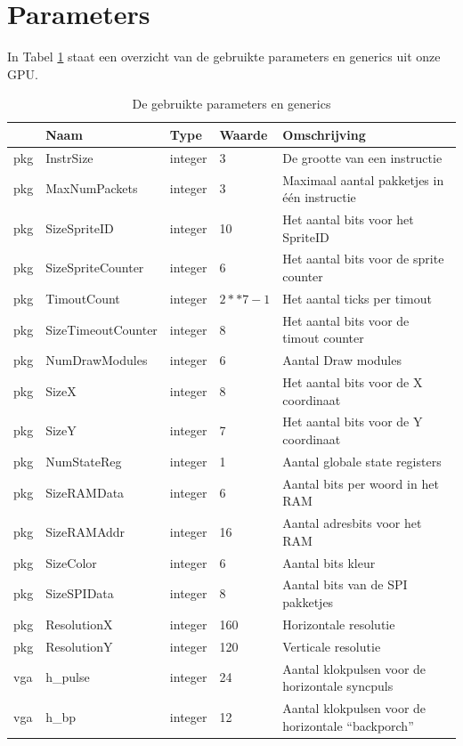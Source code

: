 \documentclass{scrartcl} %
\begin{document}
\section{Parameters} 
In Tabel \ref{tab:spec-params} staat een overzicht van de gebruikte parameters en generics uit onze GPU.

\begin{table}[H]
\centering
\caption{De gebruikte parameters en generics}
\label{tab:spec-params}
\begin{tabular}{l l l l l}
	\hline\hline
 	 & Naam & Type & Waarde & Omschrijving\\
 	\hline
	pkg & InstrSize & integer & 3 & De grootte van een instructie\\ 
	pkg & MaxNumPackets & integer & 3 & Maximaal aantal pakketjes in één instructie\\ 
	pkg & SizeSpriteID & integer & 10 & Het aantal bits voor het SpriteID \\
	pkg & SizeSpriteCounter & integer & 6 & Het aantal bits voor de sprite counter\\
	pkg & TimoutCount & integer & $2**7-1$ & Het aantal ticks per timout\\
	pkg & SizeTimeoutCounter & integer & 8 & Het aantal bits voor de timout counter\\
	pkg & NumDrawModules & integer & 6 & Aantal Draw modules\\ 
	pkg & SizeX & integer & 8 & Het aantal bits voor de X coordinaat\\
	pkg & SizeY & integer & 7 & Het aantal bits voor de Y coordinaat\\
	pkg & NumStateReg & integer & 1 & Aantal globale state registers\\
	pkg & SizeRAMData & integer & 6 & Aantal bits per woord in het RAM\\
	pkg & SizeRAMAddr & integer & 16 & Aantal adresbits voor het RAM\\
	pkg & SizeColor & integer & 6 & Aantal bits kleur\\
	pkg & SizeSPIData & integer & 8 & Aantal bits van de SPI pakketjes\\
	pkg & ResolutionX & integer & 160 & Horizontale resolutie \\
	pkg & ResolutionY & integer & 120 & Verticale resolutie \\
	vga & h\_pulse & integer & 24 & Aantal klokpulsen voor de horizontale syncpuls\\ 
	vga & h\_bp & integer & 12 & Aantal klokpulsen voor de horizontale “backporch” \\ 

\end{tabular}
\end{table}
\end{document}
